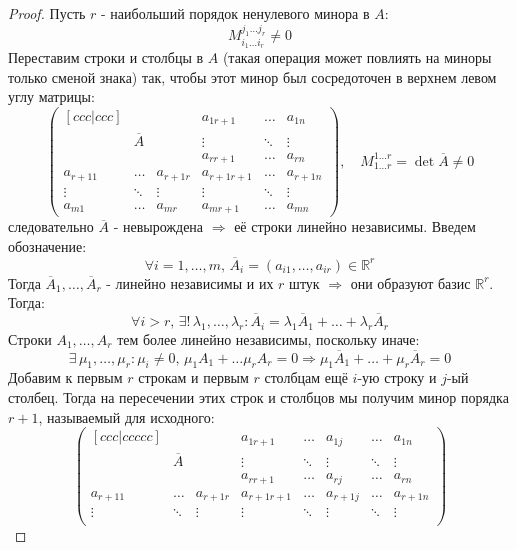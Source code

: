 \documentclass[12pt]{article}
\newcommand{\MR}{\mathbb{R}}
\theoremstyle{definition}
\begin{document}
\begin{proof}
	Пусть $r$ - наибольший порядок ненулевого минора в $A$:
	$$
		M_{i_1 \dotsc i_r}^{j_1 \dotsc j_r} \neq 0
	$$
	Переставим строки и столбцы в $A$ (такая операция может повлиять на миноры только сменой знака) так, чтобы этот минор был сосредоточен в верхнем левом углу матрицы:
	$$
		\begin{pmatrix}[ccc|ccc]
			& & & a_{1 r+ 1} &\dotsc & a_{1n}\\
			& \overline{A} & & \vdots & \ddots & \vdots \\
			& & & a_{r r + 1} & \dotsc & a_{r n}\\ \hline
			a_{r+1 1} & \dotsc & a_{r + 1 r} & a_{r+1 r + 1} & \dotsc & a_{r+1 n}\\
			\vdots & \ddots & \vdots & \vdots & \ddots & \vdots \\
			a_{m1} & \dotsc & a_{m r} & a_{m r+1} & \dotsc & a_{mn}			 
		\end{pmatrix}, \quad M_{1 \dotsc r}^{1 \dotsc r} = \det{\overline{A}}\neq 0
	$$
	следовательно $\overline{A}$ - невырождена $\Rightarrow$ её строки линейно независимы. Введем обозначение:
	$$
		\forall i = 1,\dotsc,m , \, \overline{A}_i = (a_{i1}, \dotsc , a_{ir}) \in \MR^r
	$$
	Тогда $\overline{A}_1, \dotsc, \overline{A}_r$ - линейно независимы и их $r$ штук $\Rightarrow$ они образуют базис $\MR^r$. Тогда:
	$$
		\forall i > r, \, \exists! \, \lambda_1, \dotsc, \lambda_r \colon \overline{A}_i = \lambda_1 \overline{A}_1 + \dotsc + \lambda_r \overline{A}_r 
	$$
	Строки $A_1,\dotsc,A_r$ тем более линейно независимы, поскольку иначе:
	$$
		\exists \, \mu_1, \dotsc, \mu_r \colon \mu_i \neq 0, \,  \mu_1 A_1 + \dotsc \mu_r A_r = 0 \Rightarrow \mu_1 \overline{A}_1 + \dotsc + \mu_r \overline{A}_r =0  
	$$
	Добавим к первым $r$ строкам и первым $r$ столбцам ещё $i$-ую строку и $j$-ый столбец. Тогда на пересечении этих строк и столбцов мы получим минор порядка $r+1$, называемый  для исходного:
	$$
		\begin{pmatrix}[ccc|ccccc]
			& & & a_{1 r+ 1} &\dotsc & a_{1j} & \dotsc & a_{1n}\\
			& \overline{A} & & \vdots & \ddots & \vdots & \ddots& \vdots \\
			& & & a_{r r + 1} & \dotsc & a_{r j} & \dotsc & a_{r n} \\ \hline
			a_{r+1 1} & \dotsc & a_{r + 1 r} & a_{r+1 r + 1} & \dotsc & a_{r + 1j} & \dotsc & a_{r+1 n}\\
			\vdots & \ddots & \vdots & \vdots & \ddots & \vdots & \ddots& \vdots \\

\end{pmatrix}$$
\end{proof}
\end{document}
